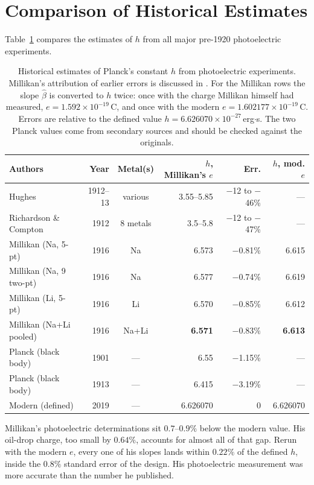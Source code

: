 \documentclass[12pt]{article}
\begin{document}
\section{Comparison of Historical Estimates}
\label{sec:comparison}

Table~\ref{tab:comparison} compares the estimates of $h$ from all major
pre-1920 photoelectric experiments.

\begin{table}[ht]
\centering
\caption{Historical estimates of Planck's constant $h$ from photoelectric
experiments.  Millikan's attribution of earlier errors is discussed in
\citet[pp.\ 373--375]{Millikan1916}.  For the Millikan rows the slope
$\hat\beta$ is converted to $h$ twice: once with the charge Millikan himself
had measured, $e = 1.592\times10^{-19}$\,C, and once with the modern
$e = 1.602177\times10^{-19}$\,C.  Errors are relative to the defined value
$h = 6.626070\times10^{-27}$\,erg$\cdot$s.  The two Planck values come from
secondary sources and should be checked against the originals.}
\label{tab:comparison}
\small
\begin{tabular}{p{3.6cm}rcrrr}
\toprule
Authors & Year & Metal(s) & $h$, Millikan's $e$ & Err.
  & $h$, mod. $e$ \\
\midrule
Hughes        & 1912--13 & various & 3.55--5.85 & $-$12 to $-$46\% & --- \\
Richardson \& Compton & 1912 & 8 metals & 3.5--5.8 & $-$12 to $-$47\% & --- \\
Millikan (Na, 5-pt)  & 1916 & Na & 6.573 & $-$0.81\% & 6.615 \\
Millikan (Na, 9 two-pt)& 1916 & Na & 6.577 & $-$0.74\% & 6.619 \\
Millikan (Li, 5-pt)  & 1916 & Li & 6.570 & $-$0.85\% & 6.612 \\
Millikan (Na+Li pooled)& 1916 & Na+Li & \textbf{6.571} & $\mathbf{-0.83\%}$
  & \textbf{6.613} \\
Planck (black body)  & 1901 & --- & 6.55 & $-$1.15\% & --- \\
Planck (black body)  & 1913 & --- & 6.415 & $-$3.19\% & --- \\
\midrule
Modern (defined)     & 2019 & --- & 6.626070 & 0 & 6.626070 \\
\bottomrule
\end{tabular}
\end{table}

Millikan's photoelectric determinations sit $0.7$--$0.9\%$ below the modern
value.  His oil-drop charge, too small by $0.64\%$, accounts for almost all of
that gap.  Rerun with the modern $e$, every one of his slopes lands within
$0.22\%$ of the defined $h$, inside the $0.8\%$ standard error of the design.
His photoelectric measurement was more accurate than the number he published.
\end{document}
